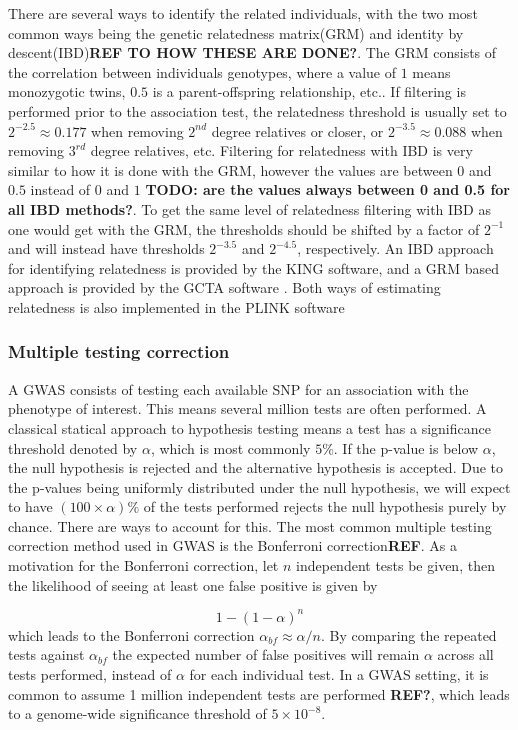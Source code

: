 There are several ways to identify the related individuals, with the two most common ways being the genetic relatedness matrix(GRM) and identity by descent(IBD)\textbf{REF TO HOW THESE ARE DONE?}. The GRM consists of the correlation between individuals genotypes, where a value of $ 1 $ means monozygotic twins, $ 0.5 $ is a parent-offspring relationship, etc.. If filtering is performed prior to the association test, the relatedness threshold is usually set to $ 2^{-2.5} \approx 0.177 $ when removing $ 2^{nd} $ degree relatives or closer, or $ 2^{-3.5} \approx 0.088 $ when removing $ 3^{rd} $ degree relatives, etc. Filtering for relatedness with IBD is very similar to how it is done with the GRM, however the values are between $ 0 $ and $ 0.5 $ instead of $ 0 $ and $ 1 $ \textbf{TODO: are the values always between 0 and 0.5 for all IBD methods?}. To get the same level of relatedness filtering with IBD as one would get with the GRM, the thresholds should be shifted by a factor of $ 2^{-1} $ and will instead have thresholds $ 2^{-3.5} $ and $ 2^{-4.5} $, respectively. An IBD approach for identifying relatedness is provided by the KING software\cite{manichaikul2010robust}, and a GRM based approach is provided by the GCTA software \cite{yang2011gcta}. Both ways of estimating relatedness is also implemented in the PLINK software\cite{chang2015second,purcell2007plink}


\subsubsection{Multiple testing correction}
A GWAS consists of testing each available SNP for an association with the phenotype of interest. This means several million tests are often performed. A classical statical approach to hypothesis testing means a test has a significance threshold denoted by $ \alpha $, which is most commonly $ 5\% $. If the p-value is below $ \alpha $, the null hypothesis is rejected and the alternative hypothesis is accepted. Due to the p-values being uniformly distributed under the null hypothesis, we will expect to have $ (100\times \alpha) \%$ of the tests performed rejects the null hypothesis purely by chance. There are ways to account for this. The most common multiple testing correction method used in GWAS is the Bonferroni correction\textbf{REF}. As a motivation for the Bonferroni correction, let $ n $ independent tests be given, then the likelihood of seeing at least one false positive is given by

\begin{equation} \label{eq:bonferroni}
1 - (1-\alpha)^n 
\end{equation}
which leads to the Bonferroni correction $ \alpha_{bf} \approx \alpha/n $. By comparing the repeated tests against $ \alpha_{bf} $ the expected number of false positives will remain $ \alpha $ across all tests performed, instead of $ \alpha $ for each individual test. In a GWAS setting, it is common to assume 1 million independent tests are performed \textbf{REF?}, which leads to a genome-wide significance threshold of $ 5 \times 10^{-8} $.


